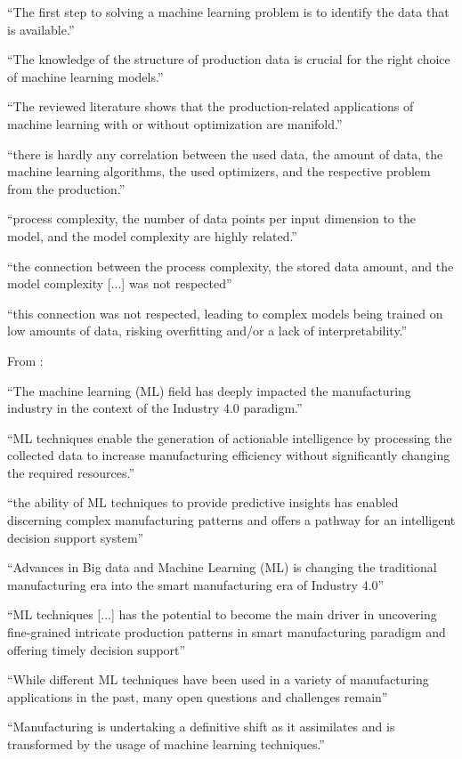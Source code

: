 “The first step to solving a machine learning problem is to identify the data that is available.”

“The knowledge of the structure of production data is crucial for the right choice of machine learning models.”

“The reviewed literature shows that the production-related applications of machine learning with or without optimization are manifold.”

“there is hardly any correlation between the used data, the amount of data, the machine learning algorithms, the used optimizers, and the respective problem from the production.”

“process complexity, the number of data points per input dimension to the model, and the model complexity are highly related.”

“the connection between the process complexity, the stored data amount, and the model complexity [...] was not respected”

“this connection was not respected, leading to complex models being trained on low amounts of data, risking overfitting and/or a lack of interpretability.”


From \parencite{rai2021ml_manufacturing_industry4} :

“The machine learning (ML) field has deeply impacted the manufacturing industry in the context of the Industry 4.0 paradigm.”

“ML techniques enable the generation of actionable intelligence by processing the collected data to increase manufacturing efficiency without significantly changing the required resources.”

“the ability of ML techniques to provide predictive insights has enabled discerning complex manufacturing patterns and offers a pathway for an intelligent decision support system”

“Advances in Big data and Machine Learning (ML) is changing the traditional manufacturing era into the smart manufacturing era of Industry 4.0”

“ML techniques [...] has the potential to become the main driver in uncovering fine-grained intricate production patterns in smart manufacturing paradigm and offering timely decision support”

“While different ML techniques have been used in a variety of manufacturing applications in the past, many open questions and challenges remain”

“Manufacturing is undertaking a definitive shift as it assimilates and is transformed by the usage of machine learning techniques.”

